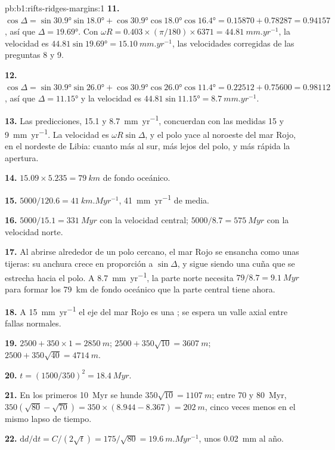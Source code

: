 \begin{solution}{pb:b1:rifts-ridges-margins:1}
\textbf{11.} $\cos\Delta = \sin\ang{30.9}\sin\ang{18.0} +
\cos\ang{30.9}\cos\ang{18.0}\cos\ang{16.4} = 0.15870 + 0.78287 = 0.94157$, así que
$\Delta = \ang{19.69}$. Con $\omega R = 0.403\times(\pi/180)\times6371 =
\qty{44.81}{mm.yr^{-1}}$, la velocidad es $44.81\sin\ang{19.69} =
\qty{15.10}{mm.yr^{-1}}$, las velocidades corregidas de las preguntas 8 y 9.

\textbf{12.} $\cos\Delta = \sin\ang{30.9}\sin\ang{26.0} +
\cos\ang{30.9}\cos\ang{26.0}\cos\ang{11.4} = 0.22512 + 0.75600 = 0.98112$, así que
$\Delta = \ang{11.15}$ y la velocidad es $44.81\sin\ang{11.15} =
\qty{8.7}{mm.yr^{-1}}$.

\textbf{13.} Las predicciones, 15.1 y \qty{8.7}{mm.yr^{-1}}, concuerdan con las medidas 15 y \qty{9}{mm.yr^{-1}}. La velocidad es
$\omega R\sin\Delta$, y el polo yace al noroeste del mar Rojo, en el nordeste de Libia: cuanto más al sur, más lejos del polo, y más
rápida la apertura.

\textbf{14.} $15.09\times5.235 = \qty{79}{km}$ de fondo oceánico.

\textbf{15.} $5000/120.6 = \qty{41}{km.Myr^{-1}}$, \qty{41}{mm.yr^{-1}} de
media.

\textbf{16.} $5000/15.1 = \qty{331}{Myr}$ con la velocidad central;
$5000/8.7 = \qty{575}{Myr}$ con la velocidad norte.

\textbf{17.} Al abrirse alrededor de un polo cercano, el mar Rojo se ensancha como unas tijeras: su anchura crece en proporción a
$\sin\Delta$, y sigue siendo una cuña que se estrecha hacia el polo. A \qty{8.7}{mm.yr^{-1}}, la parte norte necesita
$79/8.7 = \qty{9.1}{Myr}$ para formar los \qty{79}{km} de fondo oceánico que la parte central tiene ahora.

\textbf{18.} A \qty{15}{mm.yr^{-1}} el eje del mar Rojo es una ; se espera un valle axial entre fallas normales.

\textbf{19.} $2500 + 350\times1 = \qty{2850}{m}$;
$2500 + 350\sqrt{10} = \qty{3607}{m}$; $2500 + 350\sqrt{40} = \qty{4714}{m}$.

\textbf{20.} $t = (1500/350)^2 = \qty{18.4}{Myr}$.

\textbf{21.} En los primeros \qty{10}{Myr} se hunde $350\sqrt{10} = \qty{1107}{m}$;
entre 70 y \qty{80}{Myr}, $350(\sqrt{80} - \sqrt{70}) = 350\times(8.944 -
8.367) = \qty{202}{m}$, cinco veces menos en el mismo lapso de tiempo.

\textbf{22.} $\mathrm dd/\mathrm dt = C/(2\sqrt t) = 175/\sqrt{80} =
\qty{19.6}{m.Myr^{-1}}$, unos \qty{0.02}{mm} al año.


\end{solution}
